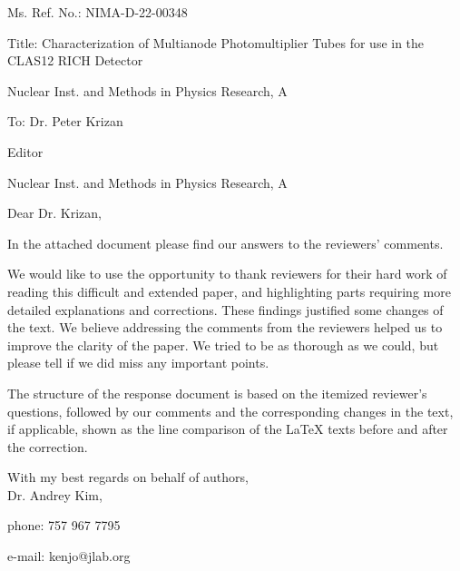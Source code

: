 \documentclass[final,3p,times]{elsarticle}
\begin{document}
Ms. Ref. No.:  NIMA-D-22-00348

Title: Characterization of Multianode Photomultiplier Tubes for use in the CLAS12 RICH Detector

Nuclear Inst. and Methods in Physics Research, A
\newline
\newline
\newline

To: Dr. Peter Krizan

Editor

Nuclear Inst. and Methods in Physics Research, A
\newline
\newline
\newline

Dear Dr. Krizan,
\newline

In the attached document please find our answers to the reviewers' comments.

We would like to use the opportunity to thank reviewers for their hard work of reading this difficult and extended paper, and highlighting parts requiring more detailed explanations and corrections. These findings justified some changes of the text. We believe addressing the comments from the reviewers helped us to improve the clarity of the paper. We tried to be as thorough as we could, but please tell if we did miss any important points.

The structure of the response document is based on the itemized reviewer's questions, followed by our comments and the corresponding changes in the text, if applicable, shown as the line comparison of the LaTeX texts before and after the correction. 

\newline

With my best regards on behalf of authors,\\

Dr. Andrey Kim,

phone: 757 967 7795

e-mail: kenjo@jlab.org
\end{document}
